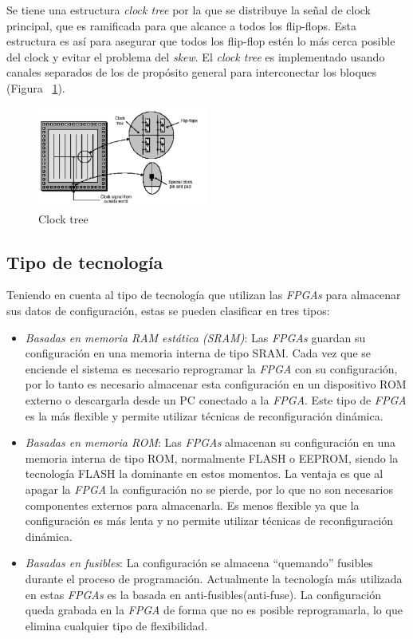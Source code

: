 		Se tiene  una estructura \textit{clock tree} por la que se distribuye la señal de clock principal, que es ramificada para
		que alcance a todos los flip-flops. Esta estructura es así para asegurar que todos los flip-flop estén lo más cerca posible del clock y evitar el
		problema del \textit{skew}. El \textit{clock tree} es implementado usando canales separados de los de propósito general para interconectar los
		bloques (Figura ~\ref{fig:ctree}).

		\begin{figure}[h!]
 		\begin{center}
 		\includegraphics[width=0.5\textwidth,keepaspectratio=true]{./images/clocktree}
  		\caption{Clock tree}
  		\label{fig:ctree}
 		\end{center}
		\end{figure}

	\subsection{Tipo de tecnología} 
	Teniendo en cuenta al tipo de tecnología que utilizan las \textit{FPGAs} para almacenar sus datos de configuración, estas se pueden clasificar en
	tres tipos:

	\begin {itemize}
	\item  
	\textit {Basadas en memoria RAM estática (SRAM)}: Las \textit{FPGAs} guardan su configuración en una memoria interna de tipo SRAM. Cada vez que se
	enciende el sistema es necesario reprogramar la \textit{FPGA} con su configuración, por lo tanto es necesario almacenar esta configuración en un
	dispositivo ROM externo o descargarla desde un PC conectado a la \textit{FPGA}. Este tipo de \textit{FPGA} es la más flexible y permite utilizar
	técnicas de reconfiguración dinámica.
	\item  
	\textit{Basadas en memoria ROM}: Las \textit{FPGAs} almacenan su configuración en una memoria interna de tipo ROM, normalmente FLASH o EEPROM, siendo
	la tecnología FLASH la dominante en estos momentos. La ventaja es que al apagar la \textit{FPGA} la configuración no se pierde, por lo que no son
	necesarios componentes externos para almacenarla. Es menos flexible ya que la configuración es más lenta y no permite utilizar técnicas de
	reconfiguración dinámica.
	\item  
	\textit{Basadas en fusibles}: La configuración se almacena “quemando” fusibles durante el proceso de programación. Actualmente la tecnología más
	utilizada en estas \textit{FPGAs} es la basada en anti-fusibles(anti-fuse). La configuración queda grabada en la \textit{FPGA} de forma que no es
	posible reprogramarla, lo que elimina cualquier tipo de flexibilidad.
 	\end {itemize}

